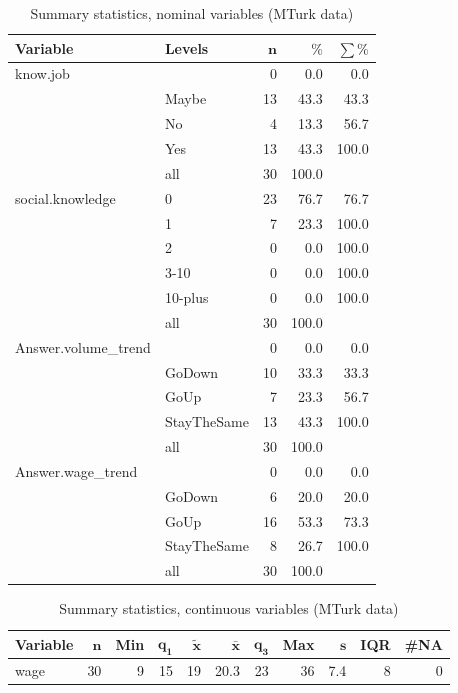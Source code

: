 \documentclass[a4paper,10pt]{article}\usepackage[]{graphicx}\usepackage[]{color}
\begin{document}
\begin{table}[ht]
\centering
{\footnotesize
\begin{tabular}{ll|rrr}
 \textbf{Variable} & \textbf{Levels} & $\mathbf{n}$ & $\mathbf{\%}$ & $\mathbf{\sum \%}$ \\ 
  \hline
know.job &  & 0 & 0.0 & 0.0 \\ 
   & Maybe & 13 & 43.3 & 43.3 \\ 
   & No & 4 & 13.3 & 56.7 \\ 
   & Yes & 13 & 43.3 & 100.0 \\ 
   \hline
 & all & 30 & 100.0 &  \\ 
   \hline
\hline
social.knowledge & 0 & 23 & 76.7 & 76.7 \\ 
   & 1 & 7 & 23.3 & 100.0 \\ 
   & 2 & 0 & 0.0 & 100.0 \\ 
   & 3-10 & 0 & 0.0 & 100.0 \\ 
   & 10-plus & 0 & 0.0 & 100.0 \\ 
   \hline
 & all & 30 & 100.0 &  \\ 
   \hline
\hline
Answer.volume\_trend &  & 0 & 0.0 & 0.0 \\ 
   & GoDown & 10 & 33.3 & 33.3 \\ 
   & GoUp & 7 & 23.3 & 56.7 \\ 
   & StayTheSame & 13 & 43.3 & 100.0 \\ 
   \hline
 & all & 30 & 100.0 &  \\ 
   \hline
\hline
Answer.wage\_trend &  & 0 & 0.0 & 0.0 \\ 
   & GoDown & 6 & 20.0 & 20.0 \\ 
   & GoUp & 16 & 53.3 & 73.3 \\ 
   & StayTheSame & 8 & 26.7 & 100.0 \\ 
   \hline
 & all & 30 & 100.0 &  \\ 
   \hline
\hline
\end{tabular}
}
\caption{Summary statistics, nominal variables (MTurk data)} 
\label{tab1:51-4030}
\end{table}
\begin{table}[ht]
\centering
{\footnotesize
\begin{tabular}{lrrrrrrrrrr}
 \textbf{Variable} & $\mathbf{n}$ & \textbf{Min} & $\mathbf{q_1}$ & $\mathbf{\widetilde{x}}$ & $\mathbf{\bar{x}}$ & $\mathbf{q_3}$ & \textbf{Max} & $\mathbf{s}$ & \textbf{IQR} & \textbf{\#NA} \\ 
  \hline
wage & 30 & 9 & 15 & 19 & 20.3 & 23 & 36 & 7.4 & 8 & 0 \\ 
  \end{tabular}
}
\caption{Summary statistics, continuous variables (MTurk data)} 
\label{tab2:51-4030}
\end{table}
\end{document}
